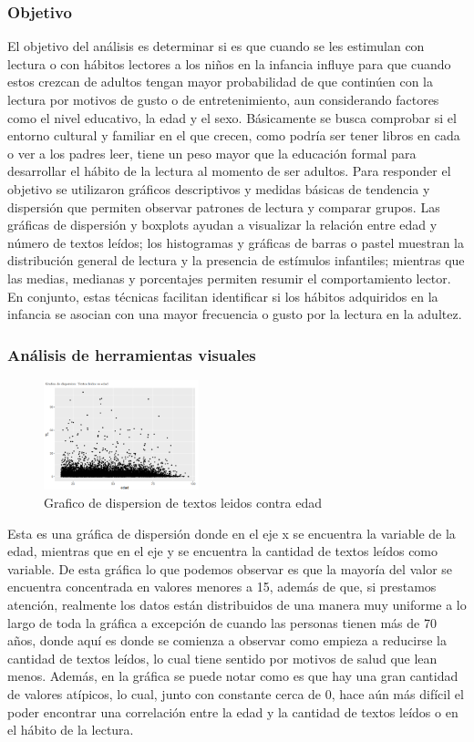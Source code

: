 \documentclass[aps,reprint]{revtex4-2}
\begin{document}
\subsubsection{Objetivo}
El objetivo del análisis es determinar si es que cuando se les estimulan con lectura o con
hábitos lectores a los niños en la infancia influye para que cuando estos crezcan de adultos
tengan mayor probabilidad de que continúen con la lectura por motivos de gusto o de
entretenimiento, aun considerando factores como el nivel educativo, la edad y el sexo.
Básicamente se busca comprobar si el entorno cultural y familiar en el que crecen,
como podría ser tener libros en cada o ver a los padres leer, tiene un peso mayor que la
educación formal para desarrollar el hábito de la lectura al momento de ser adultos.
Para responder el objetivo se utilizaron gráficos descriptivos y medidas básicas de
tendencia y dispersión que permiten observar patrones de lectura y comparar grupos. Las
gráficas de dispersión y boxplots ayudan a visualizar la relación entre edad y número de
textos leídos; los histogramas y gráficas de barras o pastel muestran la distribución general
de lectura y la presencia de estímulos infantiles; mientras que las medias, medianas y
porcentajes permiten resumir el comportamiento lector. En conjunto, estas técnicas facilitan
identificar si los hábitos adquiridos en la infancia se asocian con una mayor frecuencia o
gusto por la lectura en la adultez.
\subsubsection{Análisis de herramientas visuales}
\begin{figure}[H]
    \centering
    \includegraphics[width=0.4\textwidth]{Screenshot 2025-10-10 at 15.16.28.png}
    \caption{Grafico de dispersion de textos leidos contra edad}
    \label{fig:grafico_dispersion}
\end{figure}

Esta es una gráfica de dispersión donde en el eje x se encuentra la variable de la edad,
mientras que en el eje y se encuentra la cantidad de textos leídos como variable. De esta
gráfica lo que podemos observar es que la mayoría del valor se encuentra concentrada en
valores menores a 15, además de que, si prestamos atención, realmente los datos están
distribuidos de una manera muy uniforme a lo largo de toda la gráfica a excepción de cuando
las personas tienen más de 70 años, donde aquí es donde se comienza a observar como
empieza a reducirse la cantidad de textos leídos, lo cual tiene sentido por motivos de salud
que lean menos. Además, en la gráfica se puede notar como es que hay una gran cantidad de
valores atípicos, lo cual, junto con constante cerca de 0, hace aún más difícil el poder
encontrar una correlación entre la edad y la cantidad de textos leídos o en el hábito de la
lectura.
\end{document}
